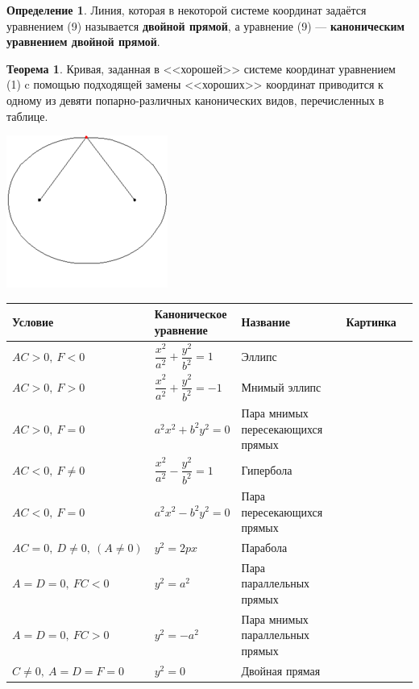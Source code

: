 \documentclass{article}
\theoremstyle{definition}
\newtheorem{definition}{Определение}
\newtheorem{theorem}{Теорема}[section]
\begin{document}
         \begin{definition}
         Линия, которая в некоторой системе координат задаётся уравнением (9) называется \textbf{двойной прямой}, а уравнение (9) --- \textbf{ каноническим уравнением двойной прямой}.
         \end{definition}

\begin{theorem}
Кривая, заданная в <<хорошей>> системе координат уравнением (1) c помощью подходящей замены <<хороших>> координат приводится к одному из девяти попарно-различных канонических видов, перечисленных в таблице.
\end{theorem}

\includegraphics[width=0.2\linewidth]{ellips.eps}

\newpage
\begin{tabular}{p{0.15\linewidth}|p{0.15\linewidth}|p{0.4\linewidth}|p{0.3\linewidth}}
     Условие        & Каноническое уравнение & Название & Картинка\\\hline
     $AC > 0,\ F<0$ & $\dfrac{x^2}{a^2} + \dfrac{y^2}{b^2} = 1$ & Эллипс & \\\hline
     $AC > 0,\ F>0$ & $\dfrac{x^2}{a^2} + \dfrac{y^2}{b^2} = -1$ & Мнимый эллипс & \\\hline
     $AC > 0,\ F = 0$ & $a^2x^2 + b^2y^2 = 0$ & Пара мнимых пересекающихся прямых &  \\\hline
     $AC < 0,\ F\neq 0$ & $\dfrac{x^2}{a^2} - \dfrac{y^2}{b^2} = 1$ & Гипербола & \\\hline
     $AC < 0,\ F = 0$ & $a^2x^2 - b^2y^2 = 0$ & Пара пересекающихся прямых & \\\hline
     $AC = 0,\ D\neq 0,\ (A\neq 0)$ & $y^2 = 2px$ & Парабола & \\\hline
     $A = D = 0,\ FC < 0$ & $y^2 = a^2$ & Пара параллельных прямых & \\\hline
     $A=D=0,\ FC > 0$ & $y^2 = -a^2$ & Пара мнимых параллельных прямых & \\\hline
     $C\neq 0,\ A=D=F=0$ & $y^2 = 0$ & Двойная прямая & 
\end{tabular}
\newpage
\end{document}
